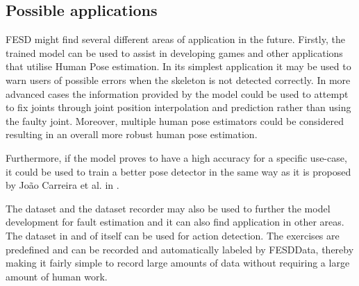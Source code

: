 \subsection{Possible applications}

FESD might find several different areas of application in the future. Firstly, the trained model can be used to assist in developing games and other applications that utilise Human Pose estimation. In its simplest application it may be used to warn users of possible errors when the skeleton is not detected correctly. In more advanced cases the information provided by the model could be used to attempt to fix joints through joint position interpolation and prediction rather than using the faulty joint. Moreover, multiple human pose estimators could be considered resulting in an overall more robust human pose estimation.

Furthermore, if the model proves to have a high accuracy for a specific use-case, it could be used to train a better pose detector in the same way as it is proposed by Jo\~ao Carreira et al. in \cite{IterativeErrorFeedback}.

The dataset and the dataset recorder may also be used to further the model development for fault estimation and it can also find application in other areas. The dataset in and of itself can be used for action detection. The exercises are predefined and can be recorded and automatically labeled by FESDData, thereby making it fairly simple to record large amounts of data without requiring a large amount of human work.